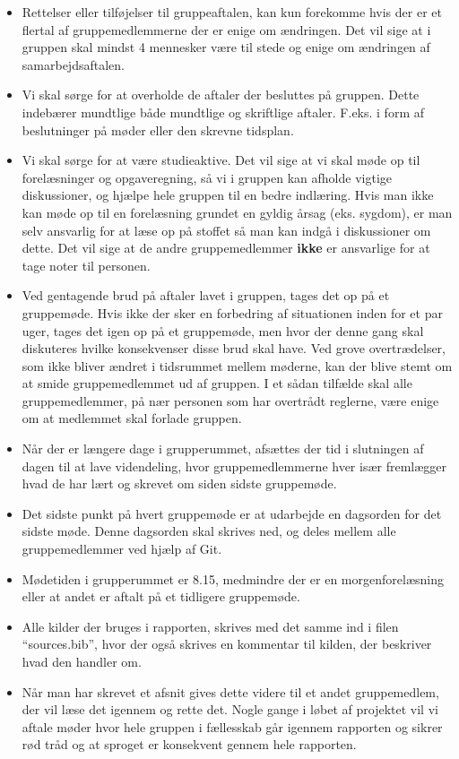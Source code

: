 \documentclass[hidelinks, 12pt]{article}
\begin{document}
	\begin{itemize}
		\item Rettelser eller tilføjelser til gruppeaftalen, kan kun forekomme hvis der er et flertal af gruppemedlemmerne der er enige om ændringen. Det vil sige at i gruppen skal mindst 4 mennesker være til stede og enige om ændringen af samarbejdsaftalen.
		\item Vi skal sørge for at overholde de aftaler der besluttes på gruppen. Dette indebærer mundtlige både mundtlige og skriftlige aftaler. F.eks. i form af beslutninger på møder eller den skrevne tidsplan.
		\item Vi skal sørge for at være studieaktive. Det vil sige at vi skal møde op til forelæsninger og opgaveregning, så vi i gruppen kan afholde vigtige diskussioner, og hjælpe hele gruppen til en bedre indlæring. Hvis man ikke kan møde op til en forelæsning grundet en gyldig årsag (eks. sygdom), er man selv ansvarlig for at læse op på stoffet så man kan indgå i diskussioner om dette. Det vil sige at de andre gruppemedlemmer \textbf{ikke} er ansvarlige for at tage noter til personen.
		\item Ved gentagende brud på aftaler lavet i gruppen, tages det op på et gruppemøde. Hvis ikke der sker en forbedring af situationen inden for et par uger, tages det igen op på et gruppemøde, men hvor der denne gang skal diskuteres hvilke konsekvenser disse brud skal have. Ved grove overtrædelser, som ikke bliver ændret i tidsrummet mellem møderne, kan der blive stemt om at smide gruppemedlemmet ud af gruppen. I et sådan tilfælde skal alle gruppemedlemmer, på nær personen som har overtrådt reglerne, være enige om at medlemmet skal forlade gruppen.
		\item Når der er længere dage i grupperummet, afsættes der tid i slutningen af dagen til at lave videndeling, hvor gruppemedlemmerne hver især fremlægger hvad de har lært og skrevet om siden sidste gruppemøde.
		\item Det sidste punkt på hvert gruppemøde er at udarbejde en dagsorden for det sidste møde. Denne dagsorden skal skrives ned, og deles mellem alle gruppemedlemmer ved hjælp af Git.
		\item Mødetiden i grupperummet er 8.15, medmindre der er en morgenforelæsning eller at andet er aftalt på et tidligere gruppemøde.
		\item Alle kilder der bruges i rapporten, skrives med det samme ind i filen ``sources.bib'', hvor der også skrives en kommentar til kilden, der beskriver hvad den handler om. 
		\item Når man har skrevet et afsnit gives dette videre til et andet gruppemedlem, der vil læse det igennem og rette det. Nogle gange i løbet af projektet vil vi aftale møder hvor hele gruppen i fællesskab går igennem rapporten og sikrer rød tråd og at sproget er konsekvent gennem hele rapporten.

\end{itemize}
\end{document}

